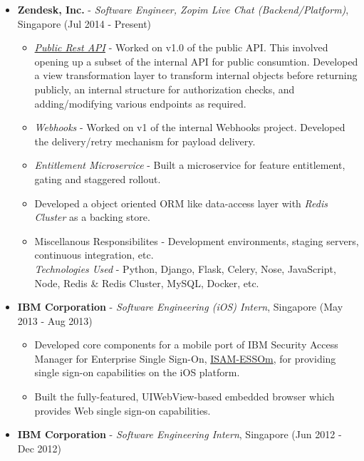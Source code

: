 \begin{itemize}
\tightlist
\item
  \textbf{Zendesk, Inc.} - \emph{Software Engineer, Zopim Live Chat
  (Backend/Platform)}, Singapore \hfill (Jul 2014 - Present)

  \begin{itemize}
  \tightlist
  \item
    \emph{\href{https://developer.zendesk.com/rest_api/docs/zopim/introduction}{Public
    Rest API}} - Worked on v1.0 of the public API. This involved opening
    up a subset of the internal API for public consumtion. Developed a
    view transformation layer to transform internal objects before
    returning publicly, an internal structure for authorization checks,
    and adding/modifying various endpoints as required.
  \item
    \emph{Webhooks} - Worked on v1 of the internal Webhooks project.
    Developed the delivery/retry mechanism for payload delivery.
  \item
    \emph{Entitlement Microservice} - Built a microservice for feature
    entitlement, gating and staggered rollout.
  \item
    Developed a object oriented ORM like data-access layer with
    \emph{Redis Cluster} as a backing store.
  \item
    Miscellanous Responsibilites - Development environments, staging
    servers, continuous integration, etc.\\
    \emph{Technologies Used} - Python, Django, Flask, Celery, Nose,
    JavaScript, Node, Redis \& Redis Cluster, MySQL, Docker, etc.
  \end{itemize}
\item
  \textbf{IBM Corporation} - \emph{Software Engineering (iOS) Intern},
  Singapore \hfill (May 2013 - Aug 2013)

  \begin{itemize}
  \tightlist
  \item
    Developed core components for a mobile port of IBM Security Access
    Manager for Enterprise Single Sign-On,
    \href{https://itunes.apple.com/us/app/isam-essom/id741972716?mt=8}{ISAM-ESSOm},
    for providing single sign-on capabilities on the iOS platform.
  \item
    Built the fully-featured, UIWebView-based embedded browser which
    provides Web single sign-on capabilities.
  \end{itemize}
\item
  \textbf{IBM Corporation} - \emph{Software Engineering Intern},
  Singapore \hfill (Jun 2012 - Dec 2012)


\end{itemize}
